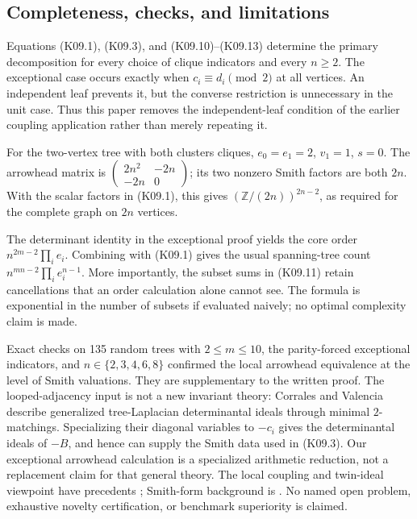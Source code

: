 \documentclass[11pt,a4paper]{article}
\theoremstyle{definition}\newtheorem{definition}[theorem]{Definition}
\theoremstyle{remark}\newtheorem{remark}[theorem]{Remark}
\newcommand{\Z}{\mathbb Z}\newcommand{\Q}{\mathbb Q}\newcommand{\F}{\mathbb F}
\numberwithin{equation}{section}
\begin{document}
\subsection{Completeness, checks, and limitations}\label{K09-sec-5}
Equations (K09.1), (K09.3), and (K09.10)--(K09.13) determine the primary decomposition for every choice of clique indicators and every $n\geq2$. The exceptional case occurs exactly when $c_i\equiv d_i\pmod2$ at all vertices. An independent leaf prevents it, but the converse restriction is unnecessary in the unit case. Thus this paper removes the independent-leaf condition of the earlier coupling application rather than merely repeating it.

For the two-vertex tree with both clusters cliques, $e_0=e_1=2$, $v_1=1$, $s=0$. The arrowhead matrix is $\left(\begin{smallmatrix}2n^2&-2n\\-2n&0\end{smallmatrix}\right)$; its two nonzero Smith factors are both $2n$. With the scalar factors in (K09.1), this gives $(\Z/(2n))^{2n-2}$, as required for the complete graph on $2n$ vertices.

The determinant identity in the exceptional proof yields the core order $n^{2m-2}\prod_i e_i$. Combining with (K09.1) gives the usual spanning-tree count $n^{mn-2}\prod_i e_i^{n-1}$. More importantly, the subset sums in (K09.11) retain cancellations that an order calculation alone cannot see. The formula is exponential in the number of subsets if evaluated naively; no optimal complexity claim is made.

Exact checks on 135 random trees with $2\leq m\leq10$, the parity-forced exceptional indicators, and $n\in\{2,3,4,6,8\}$ confirmed the local arrowhead equivalence at the level of Smith valuations. They are supplementary to the written proof. The looped-adjacency input is not a new invariant theory: Corrales and Valencia \cite{ref035} describe generalized tree-Laplacian determinantal ideals through minimal $2$-matchings. Specializing their diagonal variables to $-c_i$ gives the determinantal ideals of $-B$, and hence can supply the Smith data used in (K09.3). Our exceptional arrowhead calculation is a specialized arithmetic reduction, not a replacement claim for that general theory. The local coupling and twin-ideal viewpoint have precedents \cite{ref029,ref028}; Smith-form background is \cite{ref030}. No named open problem, exhaustive novelty certification, or benchmark superiority is claimed.
\end{document}
